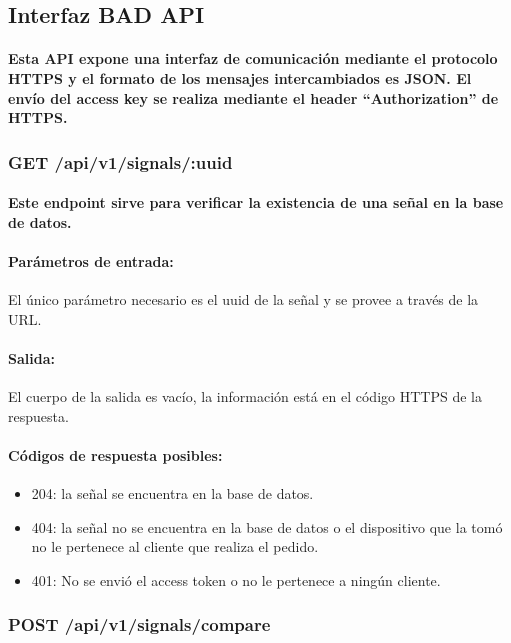 \documentclass{article}
\begin{document}
\subsection{Interfaz BAD API}
\paragraph{
Esta API expone una interfaz de comunicación mediante el protocolo HTTPS y el formato de los mensajes intercambiados es JSON. El envío del access key se realiza mediante el header “Authorization” de HTTPS.
}
\subsubsection{GET /api/v1/signals/:uuid}
\paragraph{
Este endpoint sirve para verificar la existencia de una señal en la base de datos.
}

\paragraph{
Parámetros de entrada:}
El único parámetro necesario es el uuid de la señal y se provee a través de la URL.
\paragraph{
Salida:}
El cuerpo de la salida es vacío, la información está en el código HTTPS de la respuesta.

\paragraph{
Códigos de respuesta posibles:
}
\begin{itemize}
    \item 204: la señal se encuentra en la base de datos.
    \item 404: la señal no se encuentra en la base de datos o el dispositivo que la tomó no le pertenece al cliente que realiza el pedido.
    \item 401: No se envió el access token o no le pertenece a ningún cliente.
\end{itemize}

\subsubsection{POST /api/v1/signals/compare}
\end{document}
